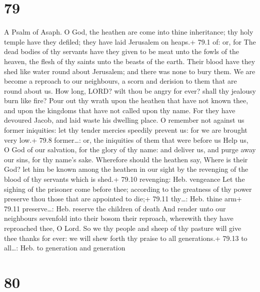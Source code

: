 \hypertarget{section-78}{%
\section{79}\label{section-78}}

A Psalm of Asaph.  O God, the heathen are come into thine
inheritance; thy holy temple have they defiled; they have laid Jerusalem
on heaps.+ 79.1 of: or, for  The dead bodies of thy servants
have they given to be meat unto the fowls of the heaven, the flesh of
thy saints unto the beasts of the earth.  Their blood have
they shed like water round about Jerusalem; and there was none to bury
them.  We are become a reproach to our neighbours, a scorn
and derision to them that are round about us.  How long,
LORD? wilt thou be angry for ever? shall thy jealousy burn like fire?
 Pour out thy wrath upon the heathen that have not known
thee, and upon the kingdoms that have not called upon thy name.
 For they have devoured Jacob, and laid waste his dwelling
place.  O remember not against us former iniquities: let thy
tender mercies speedily prevent us: for we are brought very low.+ 79.8
former\ldots: or, the iniquities of them that were before us
 Help us, O God of our salvation, for the glory of thy name:
and deliver us, and purge away our sins, for thy name's sake.
 Wherefore should the heathen say, Where is their God? let
him be known among the heathen in our sight by the revenging of the
blood of thy servants which is shed.+ 79.10 revenging: Heb. vengeance
 Let the sighing of the prisoner come before thee;
according to the greatness of thy power preserve thou those that are
appointed to die;+ 79.11 thy\ldots: Heb. thine arm+ 79.11
preserve\ldots: Heb. reserve the children of death  And
render unto our neighbours sevenfold into their bosom their reproach,
wherewith they have reproached thee, O Lord.  So we thy
people and sheep of thy pasture will give thee thanks for ever: we will
shew forth thy praise to all generations.+ 79.13 to all\ldots: Heb. to
generation and generation

\hypertarget{section-79}{%
\section{80}\label{section-79}}

